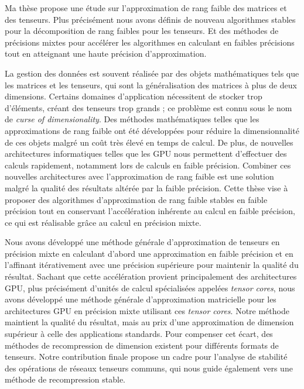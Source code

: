 Ma thèse propose une étude sur l'approximation de rang faible des matrices et
des tenseurs. Plus précisément nous avons définis de nouveau algorithmes
stables pour la décomposition de rang faibles pour les tenseurs. Et des
méthodes de précisions mixtes pour accélérer les algorithmes en calculant en
faibles précisions tout en atteignant une haute précision d'approximation.

La gestion des données est souvent réalisée par des objets mathématiques tels
que les matrices et les tenseurs, qui sont la généralisation des matrices à
plus de deux dimensions. Certains domaines d'application nécessitent de stocker
trop d'éléments, créant des tenseurs trop grands ; ce problème est connu sous
le nom de \emph{curse of dimensionality}. Des méthodes mathématiques telles que
les approximations de rang faible ont été développées pour réduire la
dimensionnalité de ces objets malgré un coût très élevé en temps de calcul. De
plus, de nouvelles architectures informatiques telles que les GPU nous
permettent d'effectuer des calculs rapidement, notamment lors de calculs en
faible précision. Combiner ces nouvelles architectures avec l'approximation de
rang faible est une solution malgré la qualité des résultats altérée par la
faible précision. Cette thèse vise à proposer des algorithmes d'approximation
de rang faible stables en faible précision tout en conservant l'accélération
inhérente au calcul en faible précision, ce qui est réalisable grâce au calcul
en précision mixte.

Nous avons développé une méthode générale d'approximation de tenseurs en
précision mixte en calculant d'abord une approximation en faible précision et
en l'affinant itérativement avec une précision supérieure pour maintenir la
qualité du résultat. Sachant que cette accélération provient principalement des
architectures GPU, plus précisément d'unités de calcul spécialisées appelées
\emph{tensor cores}, nous avons développé une méthode générale d'approximation
matricielle pour les architectures GPU en précision mixte utilisant ces
\emph{tensor cores}. Notre méthode maintient la qualité du résultat, mais au
prix d'une approximation de dimension supérieur à celle des applications
standards. Pour compenser cet écart, des méthodes de recompression de dimension
existent pour différents formats de tenseurs. Notre contribution finale propose
un cadre pour l'analyse de stabilité des opérations de réseaux tenseurs
communs, qui nous guide également vers une méthode de recompression stable.